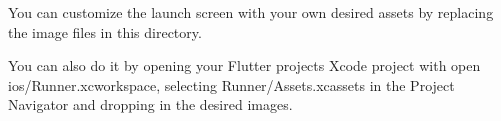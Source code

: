 You can customize the launch screen with your own desired assets by replacing the image files in this directory.

You can also do it by opening your Flutter project\textquotesingle{}s Xcode project with {\ttfamily open ios/\+Runner.\+xcworkspace}, selecting {\ttfamily Runner/\+Assets.\+xcassets} in the Project Navigator and dropping in the desired images. 